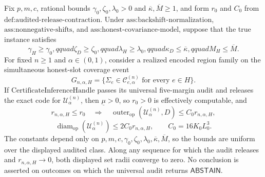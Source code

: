 Fix \(p,m,c\), rational bounds \(\gamma _0,\zeta _0,\lambda _0>0\) and \(\overline\kappa,\overline M\geq1\), and form \(r_0\) and \(C_0\) from \(\text{def:audited-release-contraction}\).  Under \(\text{ass:backshift-normalization}\), \(\text{ass:nonnegative-shifts}\), and \(\text{ass:honest-covariance-model}\), suppose that the true instance satisfies
\[
 \gamma_H\geq\gamma _0,qquad
 \zeta_D\geq\zeta _0,qquad
 \lambda_H\geq\lambda _0,qquad
 \kappa_D\leq\overline\kappa,qquad
 M_H\leq\overline M.
\]
For fixed \(n\geq1\) and \(\alpha\in(0,1)\), consider a realized encoded region family on the simultaneous honest-slot coverage event
\[
 G_{n,\alpha,H}=\{\Sigma_e\in\mathcal C^{(n)}_{e,\alpha}\text{ for every }e\in H\}.
\]
If \(\text{CertificateInferenceHandle}\) passes its universal five-margin audit and releases the exact code for \(\mathcal U^{(n)}_\alpha\), then \(\underline\mu>0\), so \(r_0>0\) is effectively computable, and
\[
 r_{n,\alpha,H}\leq r_0
 \quad\Longrightarrow\quad
 \operatorname{outer}_{\mathrm{op}}(\mathcal U^{(n)}_\alpha,D)
 \leq C_0r_{n,\alpha,H},
\]
\[
 \operatorname{diam}_{\mathrm{op}}(\mathcal U^{(n)}_\alpha)
 \leq2C_0r_{n,\alpha,H},
 \qquad C_0=16K_0L_0^3.
\]
The constants depend only on \(p,m,c,\gamma _0,\zeta _0,\lambda _0,\overline\kappa,\overline M\), so the bounds are uniform over the displayed audited class.  Along any sequence for which the audit releases and \(r_{n,\alpha,H}\to0\), both displayed set radii converge to zero.  No conclusion is asserted on outcomes on which the universal audit returns \(\mathsf{ABSTAIN}\).